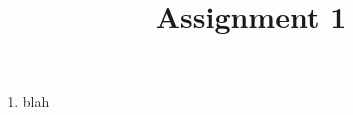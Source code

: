 \documentclass[12pt]{coursedoc}
\title{Assignment 1}
\begin{document}
\maketitle

\begin{enumerate}
\item blah
\end{enumerate}
\end{document}
